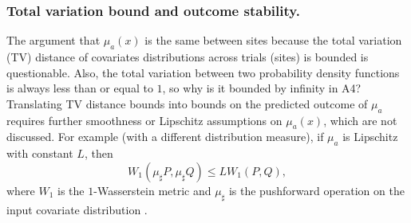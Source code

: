 \subsubsection{Total variation bound and outcome stability.}  The argument that $\mu_a(x)$ is the same between sites because the total variation (TV) distance of covariates distributions across trials (sites) is bounded is questionable. Also, the total variation between two probability density functions is always less than or equal to $1$, so why is it bounded by infinity in A4? Translating TV distance bounds into bounds on the predicted outcome of $\mu_a$ requires further smoothness or Lipschitz assumptions on $\mu_a(x)$, which are not discussed. For example (with a different distribution measure), if $\mu_a$ is Lipschitz with constant $L$, then
\[
W_1(\mu_{\sharp} P, \mu_{\sharp} Q) \le L W_1(P, Q),
\]
where $W_1$ is the $1$-Wasserstein metric and $\mu_{\sharp}$ is the pushforward operation on the input covariate distribution \citep{villani2008optimal}.


